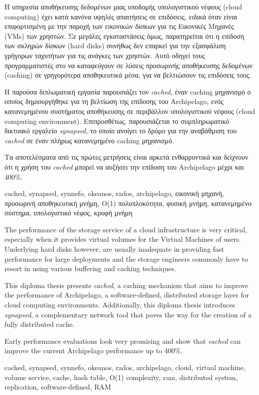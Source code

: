 \begin{abstractgr}
	Η υπηρεσία αποθήκευσης δεδομένων μιας υποδομής υπολογιστικού νέφους 
	(cloud computing) έχει κατά κανόνα υψηλές απαιτήσεις σε επιδόσεις, 
	ειδικά όταν είναι επιφορτισμένη με την παροχή των εικονικών δίσκων για 
	τις Εικονικές Μηχανές (VMs) των χρηστών. Σε μεγάλες εγκαταστάσεις όμως, 
	παρατηρείται ότι η επίδοση των σκληρών δίσκων (hard disks) συνήθως δεν 
	επαρκεί για την εξασφάλιση γρήγορων ταχυτήτων για τις ανάγκες των 
	χρηστών. Αυτό οδηγεί τους προγραμματιστές στο να καταφεύγουν σε λύσεις 
	προσωρινής αποθήκευσης δεδομένων (caching) σε γρηγορότερα αποθηκευτικά 
	μέσα, για να βελτιώσουν τις επιδόσεις τους.
	
	Η παρούσα διπλωματική εργασία παρουσιάζει τον \textit{cached}, έναν 
	caching μηχανισμό ο οποίος δημιουργήθηκε για τη βελτίωση της επίδοσης 
	του Archipelago, ενός κατανεμημένου συστήματος αποθήκευσης σε 
	περιβάλλον υπολογιστικού νέφους (cloud computing environment).	
	Επιπροσθέτως, παρουσιάζεται το συμπληρωματικό δικτυακό εργαλείο 
	\textit{synapsed}, το οποίο ανοίγει το δρόμο για την αναβάθμιση του 
	\textit{cached} σε έναν πλήρως κατανεμημένο caching μηχανισμό.
	
	Τα αποτελέσματα από τις πρώτες μετρήσεις είναι αρκετά ενθαρρυντικά και 
	δείχνουν ότι η χρήση του \textit{cached} μπορεί να αυξήσει την επίδοση του 
	Archipelago μέχρι και 400\%.
	\begin{keywordsgr}
		cached, synapsed, synnefo, okeanos, rados, archipelago,  
		εικονική μηχανή, προσωρινή αποθηκευτική μνήμη, Ο(1) 
		πολυπλοκότητα, φυσική μνήμη, κατανεμημένο σύστημα, υπολογιστικό 
		νέφος, κρυφή μνήμη
	\end{keywordsgr}
\end{abstractgr}

\begin{abstracten}
	The performance of the storage service of a cloud infrastructure is very 
	critical, especially when it provides virtual volumes for the Virtual
	Machines of users. Underlying hard disks however, are usually inadequate in 
	providing fast performance for large deployments and the storage engineers 
	commonly have to resort in using various buffering and caching techniques.
	
	This diploma thesis presents \textit{cached}, a caching mechanism that 
	aims to improve the performance of Archipelago, a software-defined, 
	distributed storage layer for cloud computing environments.  
	Additionally, this diploma thesis introduces \textit{synapsed}, a 
	complementary network tool that paves the way for the creation of a 
	fully distributed cache.
	
	Early performance evaluations look very promising and show that 
	\textit{cached} can improve the current Archipelago performance up to 
	400\%.
	\begin{keywordsen}
		cached, synapsed, synnefo, okeanos, rados, archipelago, cloud, 
		virtual machine, volume service, cache, hash table,  O(1) 
		complexity, ram, distributed system, replication, 
		software-defined, RAM
	\end{keywordsen}
\end{abstracten}

